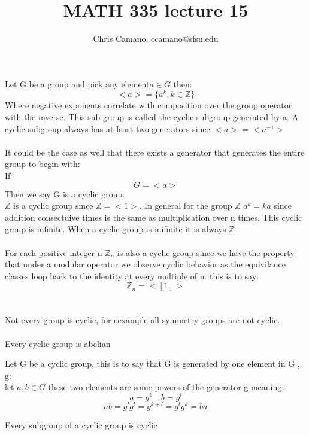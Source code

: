 \documentclass[11pt]{article}
\author{Chris Camano: ccamano@sfsu.edu}
\title{MATH 335  lecture 15 }
\date
\theoremstyle{definition}  %
\newcommand{\Z}{\mathbb{Z}}
\begin{document}
\maketitle
{} Let G be a group and pick any element$a\in G$ then:
\[
  <a>=\{a^k, k \in \Z\}
\]
Where negative exponents correlate with composition over the group operator with the inverse. This sub group is called the cyclic subgroup generated by a. A cyclic subgroup always has at least two generators since $<a>=<a^{-1}>$\\\\
It could be the case as well that there exists a generator that generates the entire group to begin with: \\
If \[
  G=<a>
\]
Then we say G is a cyclic group. \\
\proposition $\Z$ is a cyclic group since $\Z=<1>$. In general for the group $\Z$ $a^k=ka$ since addition consectuive times is the same as multiplication over n times. This cyclic group is infinite. When a cyclic group is inifinite it is always $\Z$\\\\
For each positive integer n $\Z_n$ is also a cyclic group since we have the property that under a modular operator we observe cyclic behavior as the equivilance classes loop back to the identity at every multiple of n. this is to say:
\[
  \Z_n=<[1]>
\]
\\\\
Not every group is cyclic, for eexample all symmetry groups are not cyclic. \\\\
\theorem Every cyclic group is abelian\\
\begin{proof }
  Let G be a cyclic group, this is to say that G is generated by one element in G , g:\\
  let $a,b\in G$ these two elements are some powers of the generator g meaning:
  \[
    a=g^k\quad b=g^l
  \]
  \[
    ab=g^lg^l=g^{k+l}=g^lg^k=ba
  \]

\end{proof }
\theorem Every subgroup of a cyclic group is cyclic
\end{document}
